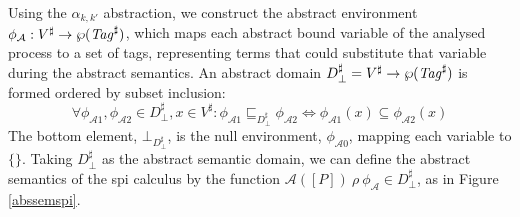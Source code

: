 \documentclass{entcs} \usepackage{entcsmacro}
\begin{document}
Using the $\alpha_{k,k'}$ abstraction, we construct the abstract environment $\phi_\mathcal{A}:V^\sharp\to\wp(\mbox{{\itshape Tag\/}}^\sharp)$, which maps each abstract bound variable of the analysed process to a set of tags, representing terms that could substitute that variable during the abstract semantics.  An abstract domain $D^\sharp_\bot=V^\sharp\to\wp(\mbox{{\itshape Tag\/}}^\sharp)$ is formed ordered by subset inclusion:
\[\forall\phi_{\mathcal{A}1},\phi_{\mathcal{A}2}\in D^\sharp_\bot,x\in V^\sharp: \phi_{\mathcal{A}1}\sqsubseteq_{D^\sharp_\bot}\phi_{\mathcal{A}2}\Leftrightarrow\phi_{\mathcal{A}1}(x)\subseteq\phi_{\mathcal{A}2}(x)\]
The bottom element, $\bot_{D^\sharp_\bot}$, is the null environment, $\phi_{\mathcal{A}0}$, mapping each variable to $\{\}$.  Taking $D^\sharp_\bot$ as the abstract semantic domain, we can define the abstract semantics of the spi calculus by the function $\mathcal{A}(\![P]\!)~\rho~\phi_\mathcal{A}\in D^\sharp_\bot$, as in Figure \ref{abssemspi}.
\end{document}
